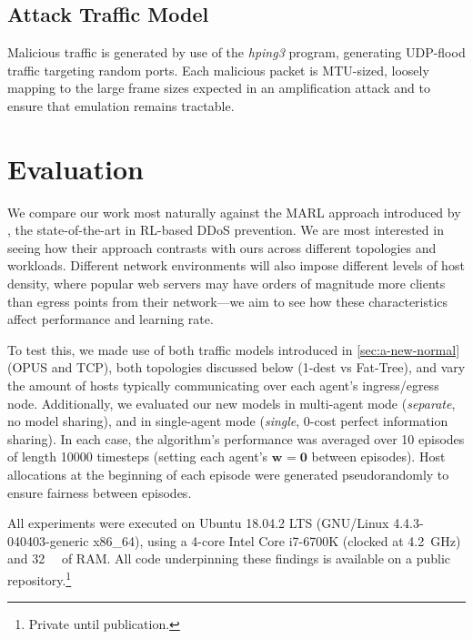 \documentclass[10pt, times, conference, letterpaper]{IEEEtran}
\newcommand{\wvec}[1]{\ensuremath{\bm{w}_{#1}}}
\begin{document}
\subsection{Attack Traffic Model}
Malicious traffic is generated by use of the \emph{hping3} program, generating UDP-flood traffic targeting random ports.
Each malicious packet is MTU-sized, loosely mapping to the large frame sizes expected in an amplification attack and to ensure that emulation remains tractable.

\section{Evaluation}


We compare our work most naturally against the MARL approach introduced by \textcite{DBLP:journals/eaai/MalialisK15}, the state-of-the-art in RL-based DDoS prevention.
We are most interested in seeing how their approach contrasts with ours across different topologies and workloads.
Different network environments will also impose different levels of host density, where popular web servers may have orders of magnitude more clients than egress points from their network---we aim to see how these characteristics affect performance and learning rate.

To test this, we made use of both traffic models introduced in \cref{sec:a-new-normal} (OPUS and TCP), both topologies discussed below (1-dest vs Fat-Tree), and vary the amount of hosts typically communicating over each agent's ingress/egress node.
Additionally, we evaluated our new models in multi-agent mode (\emph{separate}, no model sharing), and in single-agent mode (\emph{single}, 0-cost perfect information sharing).
In each case, the algorithm's performance was averaged over \num{10} episodes of length \num{10000} timesteps (setting each agent's $\wvec{}=\bm{0}$ between episodes).
Host allocations at the beginning of each episode were generated pseudorandomly to ensure fairness between episodes.

All experiments were executed on Ubuntu 18.04.2 LTS (GNU/Linux 4.4.3-040403-generic x86\_64), using a 4-core Intel Core i7-6700K (clocked at \SI{4.2}{\giga\hertz}) and \SI{32}{\gibi\byte} of RAM.
All code underpinning these findings is available on a public repository.\footnote{Private until publication.}
\end{document}
